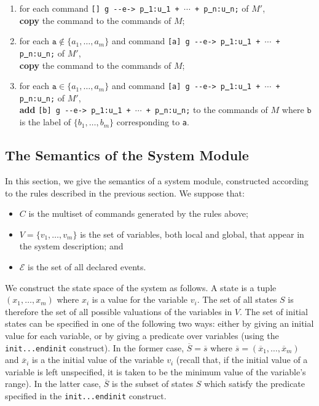 \documentclass{article}
\newcommand{\arci}[1]{{-}{-}{#1}->}
\newcommand{\calE}{\mathcal{E}}
\renewcommand{\_}{\underline{~}}
\newcommand{\events}{{\calE}}
\newcommand{\code}[1]{\texttt{#1}}
\begin{document}
\begin{enumerate}
	
    \item for each command \code{[] g \arci{e} p\_1:u\_1 + $\cdots$ + p\_n:u\_n;} of $M'$, \\ 
    \textbf{copy} the command to the commands of $M$;

    \item for each $\code{a} \not\in \{a_1,\ldots,a_m\}$ and command \code{[a] g \arci{e}  p\_1:u\_1 + $\cdots$ + p\_n:u\_n;} of $M'$, \\ 
    \textbf{copy} the command to the commands of $M$;

    \item for each $\code{a} \in \{a_1,\ldots,a_m\}$ and command \code{[a] g \arci{e}  p\_1:u\_1 + $\cdots$ + p\_n:u\_n;} of $M'$, \\
    \textbf{add} \code{[b] g \arci{e}  p\_1:u\_1 + $\cdots$ + p\_n:u\_n;} to the commands of $M$ where $\code{b}$ is the label of $\{b_1,\ldots,b_m\}$ corresponding to \code{a}.

\end{enumerate}%

\subsection*{The Semantics of the System Module}
In this section, we give the semantics of a system module, constructed according to the rules described in the previous section.
We suppose that:
\begin{itemize}
	\item $C$ is the multiset of commands generated by the rules above;
	\item $V = \{v_1, \ldots , v_m\}$ is the set of variables, both local and global, that appear in the system description; and
	\item $\events$ is the set of all declared events.
\end{itemize}

We construct the state space of the system as follows. 
A state is a tuple $(x_1, \ldots , x_m)$ where $x_i$ is a value for the variable $v_i$. 
The set of all states $S$ is therefore the set of all possible valuations of the variables in $V$. 
The set of initial states can be specified in one of the following two ways: either by giving an initial value for each variable, or by giving a predicate over variables (using the \code{init...endinit} construct). 
In the former case, $\overline{S} = \overline{s}$ where $\overline{s} = (\overline{x}_1, \ldots , \overline{x}_m)$ and $\overline{x}_i$ is a the initial value of the variable $v_i$ (recall that, if the initial value of a variable is left unspecified, it is taken to be the minimum value of the variable’s range). 
In the latter case, $\overline{S}$ is the subset of states $S$ which satisfy the
predicate specified in the \code{init...endinit} construct.
\end{document}
